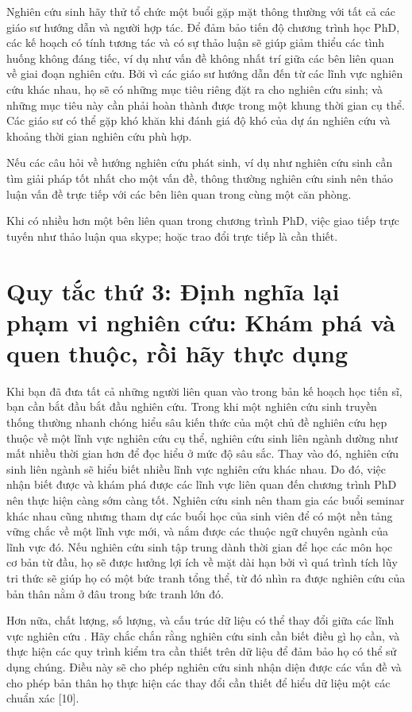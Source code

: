 \documentclass[12pt]{report}
\begin{document}
Nghiên cứu sinh hãy thử tổ chức một buổi gặp mặt thông thường với tất cả các giáo sư hướng dẫn và người hợp tác. Để đảm bảo tiến độ chương trình học PhD, các kế hoạch có tính tương tác và có sự thảo luận sẽ giúp giảm thiểu các tình huống không đáng tiếc, ví dụ như vấn đề không nhất trí giữa các bên liên quan về giai đoạn nghiên cứu. Bởi vì các giáo sư hướng dẫn đến từ các lĩnh vực nghiên cứu khác nhau, họ sẽ có những mục tiêu riêng đặt ra cho nghiên cứu sinh; và những mục tiêu này cần phải hoàn thành được trong một khung thời gian cụ thể. Các giáo sư có thể gặp khó khăn khi đánh giá độ khó của dự án nghiên cứu và khoảng thời gian nghiên cứu phù hợp.

Nếu các câu hỏi về hướng nghiên cứu phát sinh, ví dụ như nghiên cứu sinh cần tìm giải pháp tốt nhất cho một vấn đề, thông thường nghiên cứu sinh nên thảo luận vấn đề trực tiếp với các bên liên quan trong cùng một căn phòng.

Khi có nhiều hơn một bên liên quan trong chương trình PhD, việc giao tiếp trực tuyến như thảo luận qua skype; hoặc trao đổi trực tiếp là cần thiết.

\section{Quy tắc thứ 3: Định nghĩa lại phạm vi nghiên cứu: Khám phá và quen thuộc, rồi hãy thực dụng}

Khi bạn đã đưa tất cả những người liên quan vào trong bản kế hoạch học tiến sĩ, bạn cần bắt đầu bắt đầu nghiên cứu. Trong khi một nghiên cứu sinh truyền thống thường nhanh chóng hiểu sâu kiến thức của một chủ đề nghiên cứu hẹp thuộc về một lĩnh vực nghiên cứu cụ thể, nghiên cứu sinh liên ngành dường như mất nhiều thời gian hơn để đọc hiểu ở mức độ sâu sắc. Thay vào đó, nghiên cứu sinh liên ngành sẽ hiểu biết nhiều lĩnh vực nghiên cứu khác nhau. Do đó, việc nhận biết được và khám phá được các lĩnh vực liên quan đến chương trình PhD nên thực hiện càng sớm càng tốt. Nghiên cứu sinh nên tham gia các buổi seminar khác nhau cũng nhưng tham dự các buổi học của sinh viên để có một nền tảng vững chắc về một lĩnh vực mới, và nắm được các thuộc ngữ chuyên ngành của lĩnh vực đó. Nếu nghiên cứu sinh tập trung dành thời gian để học các môn học cơ bản từ đầu, họ sẽ được hưởng lợi ích về mặt dài hạn bởi vì quá trình tích lũy tri thức sẽ giúp họ có một bức tranh tổng thể, từ đó nhìn ra được nghiên cứu của bản thân nằm ở đâu trong bức tranh lớn đó.

Hơn nữa, chất lượng, số lượng, và cấu trúc dữ liệu có thể thay đổi giữa các lĩnh vực nghiên cứu \cite{9}. Hãy chắc chắn rằng nghiên cứu sinh cần biết điều gì họ cần, và thực hiện các quy trình kiểm tra cần thiết trên dữ liệu để đảm bảo họ có thể sử dụng chúng. Điều này sẽ cho phép nghiên cứu sinh nhận diện được các vấn đề và cho phép bản thân họ thực hiện các thay đổi cần thiết để hiểu dữ liệu một các chuẩn xác [10].
\end{document}
